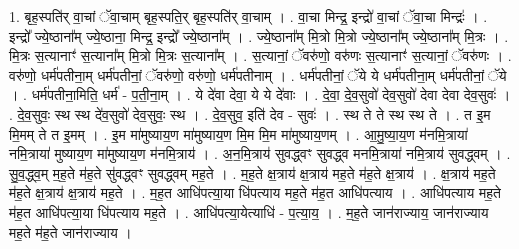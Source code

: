 \documentclass[17pt]{extarticle}
\begin{document}
1. बृह॒स्पति॑र् वा॒चां ॅवा॒चाम् बृह॒स्पति॒र् बृह॒स्पति॑र् वा॒चाम् । . वा॒चा मिन्द्र॒ इन्द्रो॑ वा॒चां ॅवा॒चा मिन्द्रः॑ । . इन्द्रो᳚ ज्ये॒ष्ठाना᳚म् ज्ये॒ष्ठाना॒ मिन्द्र॒ इन्द्रो᳚ ज्ये॒ष्ठाना᳚म् । . ज्ये॒ष्ठाना᳚म् मि॒त्रो मि॒त्रो ज्ये॒ष्ठाना᳚म् ज्ये॒ष्ठाना᳚म् मि॒त्रः । . मि॒त्रः स॒त्यानाꣳ॑ स॒त्याना᳚म् मि॒त्रो मि॒त्रः स॒त्याना᳚म् । . स॒त्यानां॒ ॅवरु॑णो॒ वरु॑णः स॒त्यानाꣳ॑ स॒त्यानां॒ ॅवरु॑णः । . वरु॑णो॒ धर्म॑पतीना॒म् धर्म॑पतीनां॒ ॅवरु॑णो॒ वरु॑णो॒ धर्म॑पतीनाम् । . धर्म॑पतीनां॒ ॅये ये धर्म॑पतीना॒म् धर्म॑पतीनां॒ ॅये । . धर्म॑पतीना॒मिति॒ धर्म॑ - प॒ती॒ना॒म् । . ये दे॑वा देवा॒ ये ये दे॑वाः । . दे॒वा॒ दे॒व॒सुवो॑ देव॒सुवो॑ देवा देवा देव॒सुवः॑ । . दे॒व॒सुवः॒ स्थ स्थ दे॑व॒सुवो॑ देव॒सुवः॒ स्थ । . दे॒व॒सुव॒ इति॑ देव - सुवः॑ । . स्थ ते ते स्थ स्थ ते । . त इ॒म मि॒मम् ते त इ॒मम् । . इ॒म मा॑मुष्याय॒ण मा॑मुष्याय॒ण मि॒म मि॒म मा॑मुष्याय॒णम् । . आ॒मु॒ष्या॒य॒ण म॑नमि॒त्राया॑ नमि॒त्राया॑ मुष्याय॒ण मा॑मुष्याय॒ण म॑नमि॒त्राय॑ । . अ॒न॒मि॒त्राय॑ सुवद्ध्वꣳ सुवद्ध्व मनमि॒त्राया॑ नमि॒त्राय॑ सुवद्ध्वम् । . सु॒व॒द्ध्व॒म् म॒ह॒ते म॑ह॒ते सु॑वद्ध्वꣳ सुवद्ध्वम् मह॒ते । . म॒ह॒ते क्ष॒त्राय॑ क्ष॒त्राय॑ मह॒ते म॑ह॒ते क्ष॒त्राय॑ । . क्ष॒त्राय॑ मह॒ते म॑ह॒ते क्ष॒त्राय॑ क्ष॒त्राय॑ मह॒ते । . म॒ह॒त आधि॑पत्या॒या धि॑पत्याय मह॒ते म॑ह॒त आधि॑पत्याय । . आधि॑पत्याय मह॒ते म॑ह॒त आधि॑पत्या॒या धि॑पत्याय मह॒ते । . आधि॑पत्या॒येत्याधि॑ - प॒त्या॒य॒ । . म॒ह॒ते जान॑राज्याय॒ जान॑राज्याय मह॒ते म॑ह॒ते जान॑राज्याय । \newline
\end{document}
